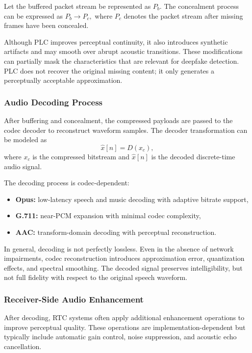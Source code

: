 Let the buffered packet stream be represented as \(P_b\). The concealment process can be expressed as
$P_b \rightarrow P_c,$
where \(P_c\) denotes the packet stream after missing frames have been concealed.

Although PLC improves perceptual continuity, it also introduces synthetic artifacts and may smooth over abrupt acoustic transitions. These modifications can partially mask the characteristics that are relevant for deepfake detection. PLC does not recover the original missing content; it only generates a perceptually acceptable approximation.

\subsubsection{Audio Decoding Process}

After buffering and concealment, the compressed payloads are passed to the codec decoder to reconstruct waveform samples. The decoder transformation can be modeled as
\begin{equation}
\hat{x}[n] = D(x_c),
\end{equation}
where \(x_c\) is the compressed bitstream and \(\hat{x}[n]\) is the decoded discrete-time audio signal.

The decoding process is codec-dependent:
\begin{itemize}
    \item \textbf{Opus:} low-latency speech and music decoding with adaptive bitrate support,
    \item \textbf{G.711:} near-PCM expansion with minimal codec complexity,
    \item \textbf{AAC:} transform-domain decoding with perceptual reconstruction.
\end{itemize}

In general, decoding is not perfectly lossless. Even in the absence of network impairments, codec reconstruction introduces approximation error, quantization effects, and spectral smoothing. The decoded signal preserves intelligibility, but not full fidelity with respect to the original speech waveform.

\subsubsection{Receiver-Side Audio Enhancement}

After decoding, RTC systems often apply additional enhancement operations to improve perceptual quality. These operations are implementation-dependent but typically include automatic gain control, noise suppression, and acoustic echo cancellation.

